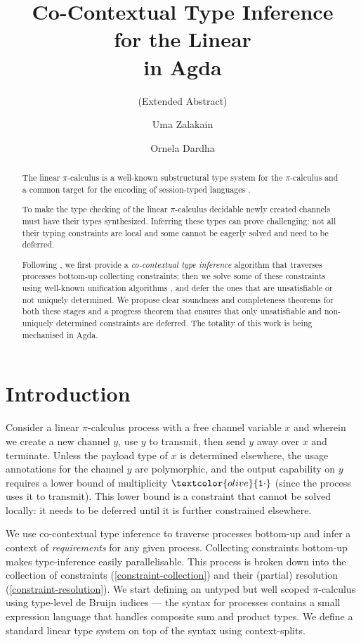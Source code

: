 \documentclass[sigplan,screen,review]{acmart}
\title
[Co-Contextual Type Inference for the Linear \Picalc{} in Agda]
{Co-Contextual Type Inference \\ for the Linear \Picalc{} \\ in Agda}
\subtitle{(Extended Abstract)}
\author{Uma Zalakain}
\affiliation{University of Glasgow}
\author{Ornela Dardha}
\affiliation{University of Glasgow}
\newcommand{\picalc}{$\pi$-calculus}
\newcommand{\constr}[1]{\textcolor{olive}{\mathtt{#1}}}
\newcommand{\tone}{\constr{1\cdot}}
\begin{document}
\begin{abstract}
  The linear \picalc{} is a well-known substructural type system for the \picalc{} and a common target for the encoding of session-typed languages \cite{DardhaGS17}.

  To make the type checking of the linear \picalc{} decidable newly created channels must have their types synthesized.
  Inferring these types can prove challenging: not all their typing constraints are local and some cannot be eagerly solved and need to be deferred.

  Following \cite{Padovani15}, we first provide a \emph{co-contextual type inference} \cite{ErdwegBKKM15} algorithm that traverses processes bottom-up collecting constraints; then we solve some of these constraints using well-known unification algorithms \cite{McBride03}, and defer the ones that are unsatisfiable or not uniquely determined.
  We propose clear soundness and completeness theorems for both these stages and a progress theorem that ensures that only unsatisfiable and non-uniquely determined constraints are deferred.
  The totality of this work is being mechanised in Agda.
\end{abstract}


\maketitle

\section{Introduction}\label{introduction}

Consider a linear \picalc{} process with a free channel variable $x$ and wherein we create a new channel $y$, use $y$ to transmit, then send $y$ away over $x$ and terminate.
Unless the payload type of $x$ is determined elsewhere, the usage annotations for the channel $y$ are polymorphic, and the output capability on $y$ requires a lower bound of multiplicity $\tone$ (since the process uses it to transmit).
This lower bound is a constraint that cannot be solved locally: it needs to be deferred until it is further constrained elsewhere.

We use co-contextual type inference \cite{ErdwegBKKM15} to traverse processes bottom-up and infer a context of \emph{requirements} for any given process.
Collecting constraints bottom-up makes type-inference easily parallelisable.
This process is broken down into the collection of constraints (\autoref{constraint-collection}) and their (partial) resolution (\autoref{constraint-resolution}).
We start defining an untyped but well scoped \picalc{} using type-level de Bruijn \cite{deBruijn72} indices --- the syntax for processes contains a small expression language that handles composite sum and product types.
We define a standard linear type system on top of the syntax using context-splits.
\end{document}
